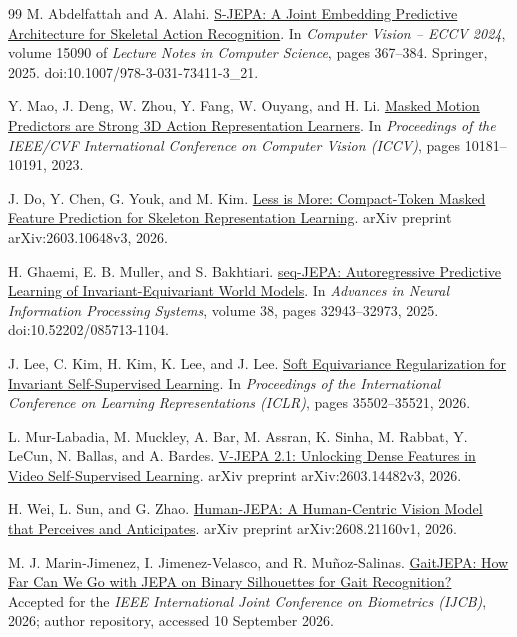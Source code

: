 \documentclass{article}
\begin{document}
{\begin{thebibliography}{99}
 M. Abdelfattah and A. Alahi. \href{https://www.ecva.net/papers/eccv_2024/papers_ECCV/papers/04755.pdf}{S-JEPA: A Joint Embedding Predictive Architecture for Skeletal Action Recognition}. In \emph{Computer Vision -- ECCV 2024}, volume 15090 of \emph{Lecture Notes in Computer Science}, pages 367--384. Springer, 2025. doi:10.1007/978-3-031-73411-3\_21.

 Y. Mao, J. Deng, W. Zhou, Y. Fang, W. Ouyang, and H. Li. \href{https://arxiv.org/abs/2308.07092}{Masked Motion Predictors are Strong 3D Action Representation Learners}. In \emph{Proceedings of the IEEE/CVF International Conference on Computer Vision (ICCV)}, pages 10181--10191, 2023.

 J. Do, Y. Chen, G. Youk, and M. Kim. \href{https://arxiv.org/abs/2603.10648}{Less is More: Compact-Token Masked Feature Prediction for Skeleton Representation Learning}. arXiv preprint arXiv:2603.10648v3, 2026.

 H. Ghaemi, E. B. Muller, and S. Bakhtiari. \href{https://proceedings.neurips.cc/paper_files/paper/2025/hash/2f63d2963526bdd9ff1b8bcc2dc9905a-Abstract-Conference.html}{seq-JEPA: Autoregressive Predictive Learning of Invariant-Equivariant World Models}. In \emph{Advances in Neural Information Processing Systems}, volume 38, pages 32943--32973, 2025. doi:10.52202/085713-1104.

 J. Lee, C. Kim, H. Kim, K. Lee, and J. Lee. \href{https://proceedings.iclr.cc/paper_files/paper/2026/hash/3be6511c8f56d0dca4b5ed59fdf9b2f4-Abstract-Conference.html}{Soft Equivariance Regularization for Invariant Self-Supervised Learning}. In \emph{Proceedings of the International Conference on Learning Representations (ICLR)}, pages 35502--35521, 2026.

 L. Mur-Labadia, M. Muckley, A. Bar, M. Assran, K. Sinha, M. Rabbat, Y. LeCun, N. Ballas, and A. Bardes. \href{https://arxiv.org/abs/2603.14482}{V-JEPA 2.1: Unlocking Dense Features in Video Self-Supervised Learning}. arXiv preprint arXiv:2603.14482v3, 2026.

 H. Wei, L. Sun, and G. Zhao. \href{https://arxiv.org/abs/2608.21160}{Human-JEPA: A Human-Centric Vision Model that Perceives and Anticipates}. arXiv preprint arXiv:2608.21160v1, 2026.

 M. J. Marin-Jimenez, I. Jimenez-Velasco, and R. Muñoz-Salinas. \href{https://github.com/AVAuco/GaitJEPA}{GaitJEPA: How Far Can We Go with JEPA on Binary Silhouettes for Gait Recognition?} Accepted for the \emph{IEEE International Joint Conference on Biometrics (IJCB)}, 2026; author repository, accessed 10 September 2026.
\end{thebibliography}
}
\clearpage
\appendix
\label{physworld:appendix-start}
\end{document}
